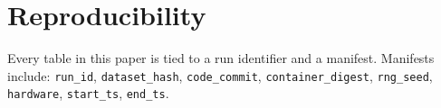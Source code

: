
\section{Reproducibility}
Every table in this paper is tied to a run identifier and a manifest. Manifests include: \texttt{run\_id}, \texttt{dataset\_hash}, \texttt{code\_commit}, \texttt{container\_digest}, \texttt{rng\_seed}, \texttt{hardware}, \texttt{start\_ts}, \texttt{end\_ts}.
